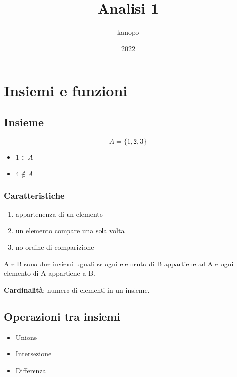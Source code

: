 \documentclass{article}
\begin{document}
    \author{kanopo}
    \title{Analisi 1}
    \date{2022}

    \maketitle
    \tableofcontents

    \listoffigures
    \listoftables


    \newpage

    \section{Insiemi e funzioni}
\subsection{Insieme}

\begin{equation*}
    A = \{1,2,3\}
\end{equation*}

\begin{itemize}
    \item $1 \in A$
    \item $4 \notin A$
\end{itemize}

\subsubsection{Caratteristiche}
\begin{enumerate}
    \item appartenenza di un elemento
    \item un elemento compare una sola volta
    \item no ordine di comparizione
\end{enumerate}

A e B sono due insiemi uguali se ogni elemento di B appartiene ad A e ogni elemento di A appartiene a B.


\textbf{Cardinalità}: numero di elementi in un insieme.

\subsection{Operazioni tra insiemi}
\begin{itemize}
    \item Unione
    \item Intersezione
    \item Differenza
\end{itemize}
\end{document}

